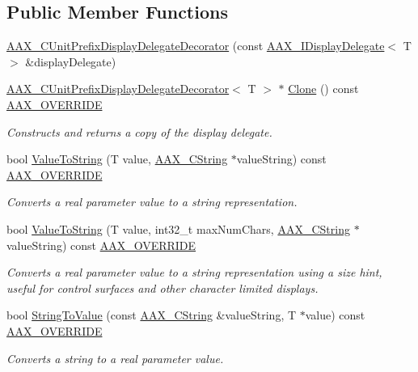 \subsection*{Public Member Functions}
\begin{DoxyCompactItemize}
\item 
\mbox{\hyperlink{a01589_a016d8c90bc04c7cb1ad6a1c23a4caed0}{A\+A\+X\+\_\+\+C\+Unit\+Prefix\+Display\+Delegate\+Decorator}} (const \mbox{\hyperlink{a01801}{A\+A\+X\+\_\+\+I\+Display\+Delegate}}$<$ T $>$ \&display\+Delegate)
\item 
\mbox{\hyperlink{a01589}{A\+A\+X\+\_\+\+C\+Unit\+Prefix\+Display\+Delegate\+Decorator}}$<$ T $>$ $\ast$ \mbox{\hyperlink{a01589_aa09598c77cd1e9556013bc8cdd651a2b}{Clone}} () const \mbox{\hyperlink{a00392_ac2f24a5172689ae684344abdcce55463}{A\+A\+X\+\_\+\+O\+V\+E\+R\+R\+I\+DE}}
\begin{DoxyCompactList}\small\item\em Constructs and returns a copy of the display delegate. \end{DoxyCompactList}\item 
bool \mbox{\hyperlink{a01589_a74d63ddd342455674e9b1b00dc0f76e2}{Value\+To\+String}} (T value, \mbox{\hyperlink{a01573}{A\+A\+X\+\_\+\+C\+String}} $\ast$value\+String) const \mbox{\hyperlink{a00392_ac2f24a5172689ae684344abdcce55463}{A\+A\+X\+\_\+\+O\+V\+E\+R\+R\+I\+DE}}
\begin{DoxyCompactList}\small\item\em Converts a real parameter value to a string representation. \end{DoxyCompactList}\item 
bool \mbox{\hyperlink{a01589_a0dc5128bed27ac1d671df4e4ac04d806}{Value\+To\+String}} (T value, int32\+\_\+t max\+Num\+Chars, \mbox{\hyperlink{a01573}{A\+A\+X\+\_\+\+C\+String}} $\ast$value\+String) const \mbox{\hyperlink{a00392_ac2f24a5172689ae684344abdcce55463}{A\+A\+X\+\_\+\+O\+V\+E\+R\+R\+I\+DE}}
\begin{DoxyCompactList}\small\item\em Converts a real parameter value to a string representation using a size hint, useful for control surfaces and other character limited displays. \end{DoxyCompactList}\item 
bool \mbox{\hyperlink{a01589_a6d930afe0a249f6936504c25d9c29764}{String\+To\+Value}} (const \mbox{\hyperlink{a01573}{A\+A\+X\+\_\+\+C\+String}} \&value\+String, T $\ast$value) const \mbox{\hyperlink{a00392_ac2f24a5172689ae684344abdcce55463}{A\+A\+X\+\_\+\+O\+V\+E\+R\+R\+I\+DE}}
\begin{DoxyCompactList}\small\item\em Converts a string to a real parameter value. \end{DoxyCompactList}\end{DoxyCompactItemize}


